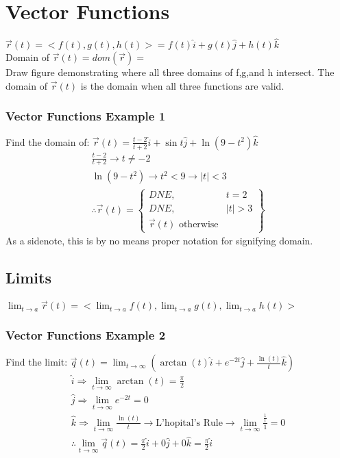 \documentclass[12pt]{article}
\begin{document}
\section{Vector Functions}
$\vec{r} (t) = <f(t),g(t),h(t)>=f(t)\hat{i}+g(t)\hat{j}+h(t)\hat{k} $\\%
Domain of $\vec{r} (t)=dom(\vec{r} ) = $\\%
Draw figure demonstrating where all three domains of f,g,and h intersect.
The domain of $\vec{r} (t) $ is the domain when all three functions are valid.
\subsubsection{Vector Functions Example 1}
Find the domain of: $\vec{r} (t) = \frac{t-2}{t+2}\hat{i}+\sin t\hat{j}+\ln(9-t^2)\hat{k} $
\begin{align}
	\frac{t-2}{t+2} \rightarrow t\neq -2 \\
	\ln(9-t^2) \rightarrow t^2 < 9 \rightarrow |t|<3\\
	\therefore \vec{r}(t) = \begin{Bmatrix}
		DNE, & t = 2\\
		DNE, & |t| > 3\\
		\vec{r}(t)  \text{ otherwise}
	\end{Bmatrix}
\end{align}
As a sidenote, this is by no means proper notation for signifying domain.

\subsection{Limits}
$\lim_{t \to a} \vec{r} (t)=<\lim_{t \to a} f(t),	\lim_{t \to a}g(t),\lim_{t \to a} h(t)>$  

\subsubsection{Vector Functions Example 2}
Find the limit: $\vec{q} (t)= \lim_{t \to \infty} (\arctan(t)\hat{i}+e^{-2t}\hat{j}+\frac{\ln(t)}{t}\hat{k})$
\begin{align}
	\hat{i} \Rightarrow \lim_{t \to \infty} \arctan{(t)} = \frac{\pi}{2}\\
	\hat{j} \Rightarrow \lim_{t \to \infty} e^{-2t} = 0\\
	\hat{k} \Rightarrow \lim_{t \to \infty} \frac{\ln(t)}{t}\rightarrow \text{L'hopital's Rule} \rightarrow \lim_{t \to \infty} \frac{\frac{1}{t}}{1} = 0\\
	\therefore \lim_{t \to \infty} \vec{q} (t) = \frac{\pi}{2}\hat{i} + 0\hat{j} + 0\hat{k} = \frac{\pi}{2}\hat{i}
\end{align}
\end{document}
